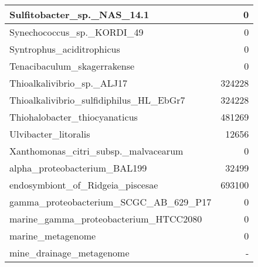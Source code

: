 \documentclass[12pt,a4paper]{article}
\begin{document}
\begin{table}[ht]
\begin{center}
\begin{tabular}{|l*{1}{|r}|}
Sulfitobacter\_sp.\_NAS\_14.1 & 0 \\ \hline
Synechococcus\_sp.\_KORDI\_49 & 0 \\ \hline
Syntrophus\_aciditrophicus & 0 \\ \hline
Tenacibaculum\_skagerrakense & 0 \\ \hline
Thioalkalivibrio\_sp.\_ALJ17 & 324228 \\ \hline
Thioalkalivibrio\_sulfidiphilus\_HL\_EbGr7 & 324228 \\ \hline
Thiohalobacter\_thiocyanaticus & 481269 \\ \hline
Ulvibacter\_litoralis & 12656 \\ \hline
Xanthomonas\_citri\_subsp.\_malvacearum & 0 \\ \hline
alpha\_proteobacterium\_BAL199 & 32499 \\ \hline
endosymbiont\_of\_Ridgeia\_piscesae & 693100 \\ \hline
gamma\_proteobacterium\_SCGC\_AB\_629\_P17 & 0 \\ \hline
marine\_gamma\_proteobacterium\_HTCC2080 & 0 \\ \hline
marine\_metagenome & 0 \\ \hline
mine\_drainage\_metagenome & - \\ \hline
\end{tabular}
\end{center}
\end{table}
\end{document}

